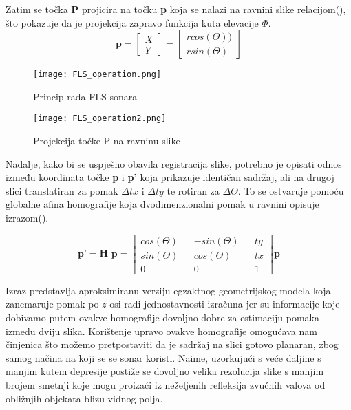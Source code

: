 \documentclass[times, utf8, diplomski]{fer}
\begin{document}
Zatim se točka \textbf{P} projicira na točku \textbf{p} koja se nalazi na ravnini slike relacijom(), što pokazuje da je projekcija zapravo funkcija kuta elevacije $\Phi$.
$$ \textbf{p}=\begin{bmatrix}
X \\
Y 
\end{bmatrix} = \begin{bmatrix}
r cos(\Theta) )\\
r sin(\Theta) 

\end{bmatrix} $$


\begin{figure}[htb]
\centering
\texttt{[image: FLS\_operation.png]}
\caption{Princip rada FLS sonara}
\label{fig:Mosaicing-pipeline}
\end{figure}
\begin{figure}[htb]
\centering
\texttt{[image: FLS\_operation2.png]}
\caption{Projekcija točke P na ravninu slike}
\label{fig:Mosaicing-pipeline}
\end{figure}
\pagebreak
Nadalje, kako bi se uspješno obavila registracija slike, potrebno je opisati odnos između koordinata točke \textbf{p} i \textbf{p'} koja prikazuje identičan sadržaj, ali na drugoj slici translatiran za pomak $\Delta tx$ i $\Delta ty$ te rotiran za $\Delta\Theta$. To se ostvaruje pomoću globalne afina homografije koja dvodimenzionalni pomak u ravnini opisuje  izrazom().

$$ \textbf{p'}= \textbf{H p} = \begin{bmatrix}
 cos(\Theta) && -sin(\Theta) && ty \\
sin(\Theta) &&  cos(\Theta) && tx\\
0 && 0 && 1
\end{bmatrix} \textbf{p}$$

Izraz predstavlja aproksimiranu verziju egzaktnog geometrijskog modela koja zanemaruje pomak po $z$ osi radi jednostavnosti izračuna jer su informacije koje dobivamo putem ovakve homografije dovoljno dobre za estimaciju pomaka između dviju slika. Korištenje upravo ovakve homografije omogućava nam činjenica što možemo pretpostaviti da je sadržaj na slici gotovo planaran, zbog samog načina na koji se se sonar koristi. Naime, uzorkujući s veće daljine s manjim kutem depresije postiže se dovoljno velika rezolucija slike s manjim brojem  smetnji koje mogu proizaći iz neželjenih refleksija zvučnih valova od obližnjih objekata blizu vidnog polja.
\newpage
\end{document}

